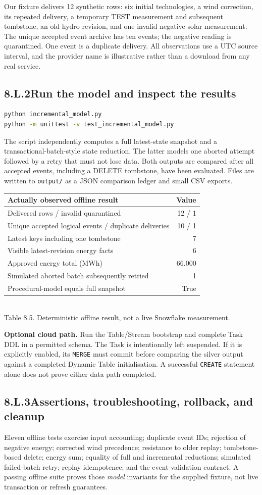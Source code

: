\documentclass[11pt,twoside]{article}
\newcommand{\topic}[2]{\subsection*{#1\quad #2}}
\begin{document}
Our fixture delivers 12 synthetic rows: six initial technologies, a wind correction, its repeated delivery, a temporary TEST measurement and subsequent tombstone, an old hydro revision, and one invalid negative solar measurement. The unique accepted event archive has ten events; the negative reading is quarantined. One event is a duplicate delivery. All observations use a UTC source interval, and the provider name is illustrative rather than a download from any real service.
\topic{8.L.2}{Run the model and inspect the results}
\begin{lstlisting}[language=bash,caption={Reproducible offline commands from the companion lab directory.}]
python incremental_model.py
python -m unittest -v test_incremental_model.py
\end{lstlisting}
The script independently computes a full latest-state snapshot and a transactional-batch-style state reduction. The latter models one aborted attempt followed by a retry that must not lose data. Both outputs are compared after all accepted events, including a DELETE tombstone, have been evaluated. Files are written to \texttt{output/} as a JSON comparison ledger and small CSV exports.
\begin{center}\renewcommand{\arraystretch}{1.1}\begin{tabularx}{\linewidth}{@{}Xr@{}}\toprule
\textbf{Actually observed offline result}&\textbf{Value}\\\midrule
Delivered rows / invalid quarantined&12 / 1\\
Unique accepted logical events / duplicate deliveries&10 / 1\\
Latest keys including one tombstone&7\\
Visible latest-revision energy facts&6\\
Approved energy total (MWh)&66.000\\
Simulated aborted batch subsequently retried&1\\
Procedural-model equals full snapshot&True\\\bottomrule
\end{tabularx}\\{\fontsize{8}{9.5}\selectfont\color{inkgray}Table 8.5. Deterministic offline result, not a live Snowflake measurement.}\end{center}
\textbf{Optional cloud path.} Run the Table/Stream bootstrap and complete Task DDL in a permitted schema. The Task is intentionally left suspended. If it is explicitly enabled, its \texttt{MERGE} must commit before comparing the silver output against a completed Dynamic Table initialisation. A successful \texttt{CREATE} statement alone does not prove either data path completed.
\newpage
\topic{8.L.3}{Assertions, troubleshooting, rollback, and cleanup}
Eleven offline tests exercise input accounting; duplicate event IDs; rejection of negative energy; corrected wind precedence; resistance to older replay; tombstone-based delete; energy sum; equality of full and incremental reductions; simulated failed-batch retry; replay idempotence; and the event-validation contract. A passing offline suite proves those \emph{model} invariants for the supplied fixture, not live transaction or refresh guarantees.
\end{document}

